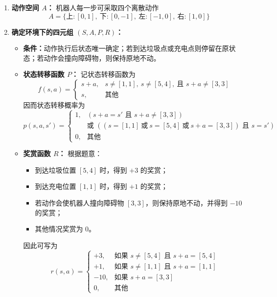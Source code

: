 \documentclass[../main.tex]{subfiles}
\begin{document}
\begin{enumerate}
\begin{enumerate}
{\begin{enumerate}
            \item \textbf{动作空间 $A$：}
            机器人每一步可采取四个离散动作
            $$
            A=\{\text{上}:[0,1],\ \text{下}:[0,-1],\ \text{左}:[-1,0],\ \text{右}:[1,0]\}
            $$
        
            \item \textbf{确定环境下的四元组 $(S,A,P,R)$：}
            \begin{itemize}
                \item \textbf{条件：}动作执行后状态唯一确定；若到达垃圾点或充电点则停留在原状态；若动作会撞向障碍物，则保持原地不动。
                
                \item \textbf{状态转移函数 $P$：}
                记状态转移函数为
                $$
                f(s,a)=
                \begin{cases}
                s+a, & s\neq [1,1],\ s\neq [5,4],\ \text{且 } s+a\neq [3,3] \\
                s, & \text{其他}
                \end{cases}
                $$
                因而状态转移概率为
                $$
                p(s,a,s')=
                \begin{cases}
                1, & (s+a=s' \text{ 且 } s+a\neq [3,3]) \\
                   & \text{或 } ((s=[1,1]\ \text{或}\ s=[5,4]\ \text{或}\ s+a=[3,3]) \text{ 且 } s=s') \\
                0, & \text{其他}
                \end{cases}
                $$
                
                \item \textbf{奖赏函数 $R$：}
                根据题意：
                \begin{itemize}
                    \item 到达垃圾位置 $[5,4]$ 时，得到 $+3$ 的奖赏；
                    \item 到达充电位置 $[1,1]$ 时，得到 $+1$ 的奖赏；
                    \item 若动作会使机器人撞向障碍物 $[3,3]$，则保持原地不动，并得到 $-10$ 的奖赏；
                    \item 其他情况奖赏为 $0$。
                \end{itemize}
                因此可写为
                $$
                r(s,a)=
                \begin{cases}
                +3, & \text{如果 } s\neq [5,4] \text{ 且 } s+a=[5,4] \\
                +1, & \text{如果 } s\neq [1,1] \text{ 且 } s+a=[1,1] \\
                -10, & \text{如果 } s+a=[3,3] \\
                0, & \text{其他}
                \end{cases}
                $$
            \end{itemize}
        

\end{enumerate}}
\end{enumerate}
\end{enumerate}
\end{document}
